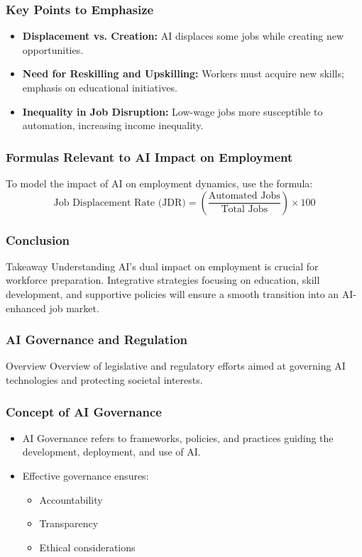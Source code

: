\documentclass[aspectratio=169]{beamer}
\begin{document}
\begin{frame}[fragile]
    \frametitle{Key Points to Emphasize}
    \begin{itemize}
        \item \textbf{Displacement vs. Creation:} AI displaces some jobs while creating new opportunities.
        \item \textbf{Need for Reskilling and Upskilling:} Workers must acquire new skills; emphasis on educational initiatives.
        \item \textbf{Inequality in Job Disruption:} Low-wage jobs more susceptible to automation, increasing income inequality.
    \end{itemize}
\end{frame}

\begin{frame}[fragile]
    \frametitle{Formulas Relevant to AI Impact on Employment}
    To model the impact of AI on employment dynamics, use the formula:
    \begin{equation}
        \text{Job Displacement Rate (JDR)} = \left( \frac{\text{Automated Jobs}}{\text{Total Jobs}} \right) \times 100
    \end{equation}
\end{frame}

\begin{frame}[fragile]
    \frametitle{Conclusion}
    \begin{block}{Takeaway}
        Understanding AI's dual impact on employment is crucial for workforce preparation. Integrative strategies focusing on education, skill development, and supportive policies will ensure a smooth transition into an AI-enhanced job market.
    \end{block}
\end{frame}

\begin{frame}[fragile]
    \frametitle{AI Governance and Regulation}
    \begin{block}{Overview}
        Overview of legislative and regulatory efforts aimed at governing AI technologies and protecting societal interests.
    \end{block}
\end{frame}

\begin{frame}[fragile]
    \frametitle{Concept of AI Governance}
    \begin{itemize}
        \item AI Governance refers to frameworks, policies, and practices guiding the development, deployment, and use of AI.
        \item Effective governance ensures:
        \begin{itemize}
            \item Accountability
            \item Transparency
            \item Ethical considerations
        \end{itemize}
    \end{itemize}
\end{frame}
\end{document}
